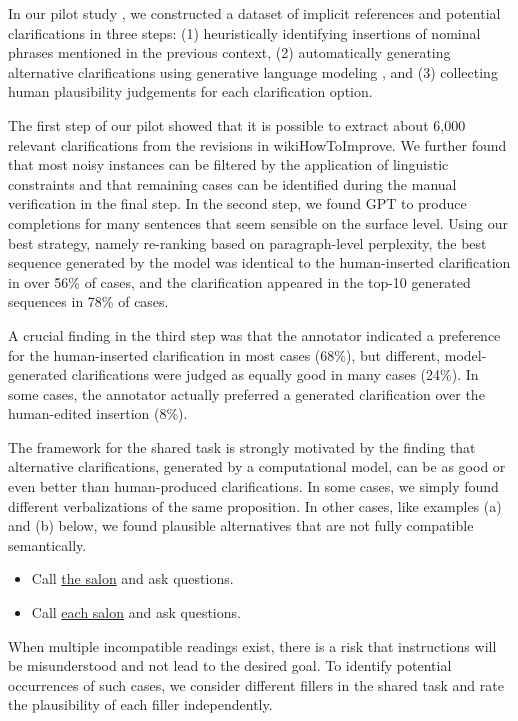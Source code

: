 \documentclass[11pt]{article}
\begin{document}
In our pilot study \cite{anthonio-roth-2021-resolving}, we constructed a dataset of implicit references and potential clarifications in three steps: (1) heuristically identifying insertions of nominal phrases mentioned in the previous context, (2) automatically generating alternative clarifications using generative language modeling \cite[GPT;][]{Radford:2018:gpt}, and (3) collecting human plausibility judgements for each clarification option. 

The first step of our pilot showed that it is possible to extract about 6,000 relevant clarifications from the revisions in wikiHowToImprove. We further found that most noisy instances can be filtered by the application of linguistic constraints and that remaining cases can be identified during the manual verification in the final step. In the second step, we found GPT to produce completions for many sentences that seem sensible on the surface level. Using our best strategy, namely re-ranking based on paragraph-level perplexity, the best sequence generated by the model was identical to the human-inserted clarification in over 56\% of cases, and the clarification appeared in the top-10 generated sequences in 78\% of cases.

A crucial finding in the third step was that the annotator indicated a preference for the human-inserted clarification in most cases (68\%), but different, model-generated clarifications were judged as equally good in many cases (24\%). In some cases, the annotator actually preferred a generated clarification over the human-edited insertion (8\%).

The framework for the shared task is strongly motivated by the finding that alternative clarifications, generated by a computational model, can be as good or even better than human-produced clarifications. In some cases, we simply found different verbalizations of the same proposition. In other cases, like examples (a) and (b) below, we found plausible alternatives that are not fully compatible semantically.

\begin{itemize}
\item[(a)] Call \underline{the salon} and ask questions.
\item[(b)] Call \underline{each salon} and ask questions.
\end{itemize}

When multiple incompatible readings exist, there is a risk that instructions will be misunderstood and not lead to the desired goal. To identify potential occurrences of such cases, we consider different fillers in the shared task and rate the plausibility of each filler independently.
\end{document}
